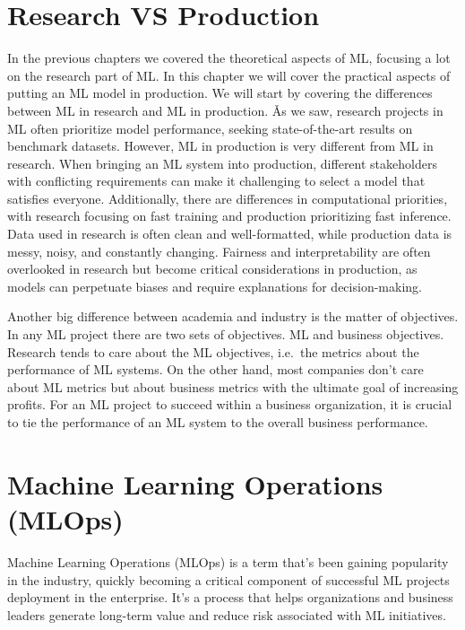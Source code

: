 \section{Research VS Production}

In the previous chapters we covered the theoretical aspects of ML, focusing a lot on the research part of ML. In this
chapter we will cover the practical aspects of putting an ML model in production. We will start by covering the
differences between ML in research and ML in production. \v

As we saw, research projects in ML often prioritize model performance, seeking state-of-the-art results on benchmark
datasets. However, ML in production is very different from ML in research. When bringing an ML system into production,
different stakeholders with conflicting requirements can make it challenging to select a model that satisfies
everyone. Additionally, there are differences in computational priorities, with research focusing on fast training
and production prioritizing fast inference. Data used in research is often clean and well-formatted, while production
data is messy, noisy, and constantly changing. Fairness and interpretability are often overlooked in research but
become critical considerations in production, as models can perpetuate biases and require explanations for
decision-making.


Another big difference between academia and industry is the matter of objectives. In any ML project there are two
sets of objectives. ML and business objectives. Research tends to care about the ML objectives, i.e.\ the metrics
about the performance of ML systems. On the other hand, most companies don't care about ML metrics but about business
metrics with the ultimate goal of increasing profits. For an ML project to succeed within a business organization, it
is crucial to tie the performance of an ML system to the overall business performance.

\section{Machine Learning Operations (MLOps)}

Machine Learning Operations (MLOps) is a term that's been gaining popularity in the industry, quickly becoming a
critical component of successful ML projects deployment in the enterprise. It's a process that helps organizations
and business leaders generate long-term value and reduce risk associated with ML initiatives.

